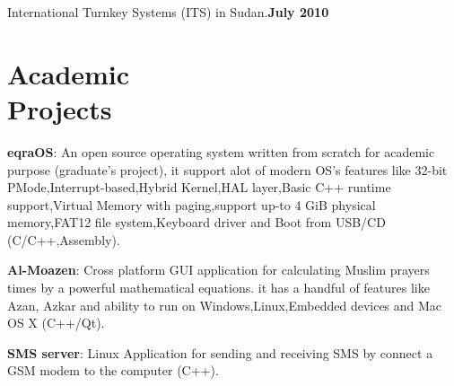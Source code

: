 \documentclass[margin,line,a4paper]{resume}
\begin{document}
\begin{resume}
International Turnkey Systems (ITS) in Sudan.\hfill \textbf{July 2010}\vspace{-3mm}\\\vspace{-1mm}%








    \section{\mysidestyle Academic\\ Projects}

\textbf{eqraOS}: An open source operating system written from scratch for academic purpose (graduate's project), it support alot of modern OS’s features like 32-bit PMode,Interrupt-based,Hybrid Kernel,HAL layer,Basic C++ runtime support,Virtual Memory with paging,support up-to 4 GiB physical memory,FAT12 file system,Keyboard driver and Boot from USB/CD (C/C++,Assembly).
\vspace{-2mm}


\textbf{Al-Moazen}: Cross platform GUI application for calculating Muslim prayers times by a powerful mathematical equations. it has a handful of features like Azan, Azkar and ability to run on Windows,Linux,Embedded devices and Mac OS X (C++/Qt).
\vspace{-2mm}


\textbf{SMS server}: Linux Application for sending and receiving SMS by connect a GSM modem to the computer (C++).
\vspace{-2mm}


\end{resume}
\end{document}
